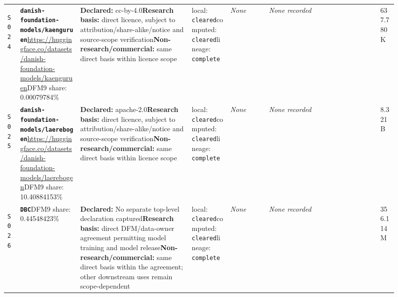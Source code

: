\documentclass[9pt,a4paper]{article}
\newcommand{\srcid}[1]{\hypertarget{src:#1}{\texttt{#1}}}
\begin{document}
\begin{landscape}
\begin{longtable}{@{}L{0.03\linewidth}L{0.14\linewidth}L{0.26\linewidth}L{0.09\linewidth}L{0.09\linewidth}L{0.265\linewidth}L{0.045\linewidth}@{}}
\srcid{S024} & \textbf{\nolinkurl{danish-foundation-models/kaenguruen}}\newline \url{https://huggingface.co/datasets/danish-foundation-models/kaenguruen}\newline DFM9 share: 0.00079784\% & \textbf{Declared:} cc-by-4.0\newline \textbf{Research basis:} direct licence, subject to attribution/share-alike/notice and source-scope verification\newline \textbf{Non-research/commercial:} same direct basis within licence scope & local: \texttt{cleared}\newline computed: \texttt{cleared}\newline lineage: \texttt{complete} & \textit{None} & \textit{None recorded} & 637.780K \\
\srcid{S025} & \textbf{\nolinkurl{danish-foundation-models/laerebogen}}\newline \url{https://huggingface.co/datasets/danish-foundation-models/laerebogen}\newline DFM9 share: 10.40884153\% & \textbf{Declared:} apache-2.0\newline \textbf{Research basis:} direct licence, subject to attribution/share-alike/notice and source-scope verification\newline \textbf{Non-research/commercial:} same direct basis within licence scope & local: \texttt{cleared}\newline computed: \texttt{cleared}\newline lineage: \texttt{complete} & \textit{None} & \textit{None recorded} & 8.321B \\
\srcid{S026} & \textbf{\nolinkurl{DBC}}\newline \url{}\newline DFM9 share: 0.44548423\% & \textbf{Declared:} No separate top-level declaration captured\newline \textbf{Research basis:} direct DFM/data-owner agreement permitting model training and model release\newline \textbf{Non-research/commercial:} same direct basis within the agreement; other downstream uses remain scope-dependent & local: \texttt{cleared}\newline computed: \texttt{cleared}\newline lineage: \texttt{complete} & \textit{None} & \textit{None recorded} & 356.114M \\

\end{longtable}
\end{landscape}
\end{document}
